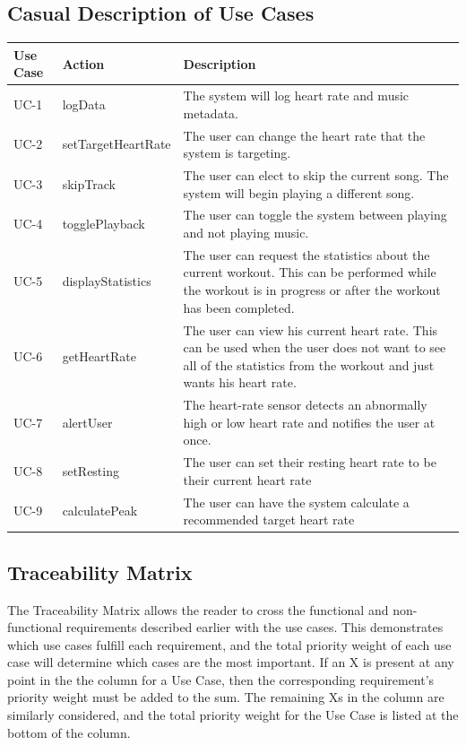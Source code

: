 \documentclass[letterpaper,english, 12pt]{scrreprt}
\begin{document}
\subsection{Casual Description of Use Cases}
\begin{center}
        \begin{tabular}{|C{2cm}|C{2cm}|C{10cm}|}
                \hline
                        Use Case & Action & Description \\
                \hline
                        UC-1 & logData & The system will log heart rate and music metadata.\\
                \hline
                        UC-2 & setTargetHeartRate & The user can change the heart rate that the system is targeting.\\
                \hline
                        UC-3 & skipTrack & The user can elect to skip the current song. The system will begin playing a different song.\\
                \hline
                        UC-4 & togglePlayback & The user can toggle the system between playing and not playing music.\\
                \hline
                        UC-5 & displayStatistics& The user can request the statistics about the current workout. This can be performed while the workout is in progress or after the workout has been completed. \\
                \hline
                        UC-6 & getHeartRate & The user can view his current heart rate. This can be used when the user does not want to see all of the statistics from the workout and just wants his heart rate. \\
                \hline
                        UC-7 & alertUser & The heart-rate sensor detects an abnormally high or low heart rate and notifies the user at once.\\
                \hline
			UC-8 & setResting & The user can set their resting heart rate to be their current heart rate \\
		\hline
			UC-9 & calculatePeak & The user can have the system calculate a recommended target heart rate \\
		\hline
        \end{tabular}
\end{center}

\subsection{Traceability Matrix}
The Traceability Matrix allows the reader to cross the functional and non-functional requirements described earlier with the use cases. This demonstrates which use cases fulfill each requirement, and the total priority weight of each use case will determine which cases are the most important. If an X is present at any point in the the column for a Use Case, then the corresponding requirement's priority weight must be added to the sum. The remaining Xs in the column are similarly considered, and the total priority weight for the Use Case is listed at the bottom of the column. 
\end{document}
